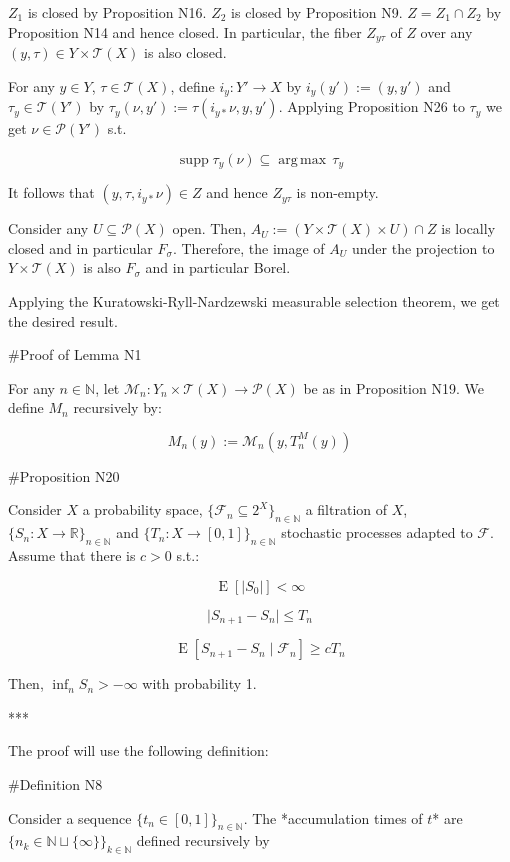 \documentclass[a4paper]{article}
\DeclareMathOperator{\Supp}{supp}
\DeclareMathOperator{\E}{E}
\newcommand{\Argmax}[1]{\underset{#1}{\operatorname{arg\,max}}\,}
\newcommand{\Nats}{\mathbb{N}}
\newcommand{\Reals}{\mathbb{R}}
\newcommand{\Sq}[2]{\{#1\}_{#2 \in \Nats}}
\newcommand{\Sqn}[1]{\Sq{#1}{n}}
\newcommand{\Abs}[1]{\lvert #1 \rvert}
\newcommand{\Prob}{\mathcal{P}}
\newcommand{\T}{\mathcal{T}}
\newcommand{\F}{\mathcal{F}}
\begin{document}
${Z_1}$ is closed by Proposition N16. ${Z_2}$ is closed by Proposition N9. ${Z = Z_1 \cap Z_2}$ by Proposition N14 and hence closed. In particular, the fiber ${Z_{y\tau}}$ of ${Z}$ over any ${(y,\tau) \in Y \times \T(X)}$ is also closed. 

For any ${y \in Y}$, ${\tau \in \T(X)}$, define ${i_y: Y' \rightarrow X}$ by ${i_y(y'):=(y,y')}$ and ${\tau_y \in \T(Y')}$ by ${\tau_y(\nu,y'):=\tau(i_{y*}\nu,y,y')}$. Applying Proposition N26 to ${\tau_y}$ we get ${\nu \in \Prob(Y')}$ s.t.

$$\Supp \tau_y(\nu) \subseteq \Argmax{} \tau_y$$

It follows that ${(y,\tau,i_{y*}\nu) \in Z}$ and hence ${Z_{y\tau}}$ is non-empty.

Consider any ${U \subseteq \Prob(X)}$ open. Then, ${A_U:=(Y \times \T(X) \times U) \cap Z}$ is locally closed and in particular ${F_\sigma}$. Therefore, the image of ${A_U}$ under the projection to ${Y \times \T(X)}$ is also ${F_\sigma}$ and in particular Borel. 

Applying the Kuratowski-Ryll-Nardzewski measurable selection theorem, we get the desired result.

\#Proof of Lemma N1

For any ${n \in \Nats}$, let ${\mathcal{M}_n: Y_n \times \T(X) \rightarrow \Prob(X)}$ be as in Proposition N19. We define ${M_n}$ recursively by:

$$M_n(y):=\mathcal{M}_n(y,T_n^M(y))$$

\#Proposition N20

Consider ${X}$ a probability space, ${\{\F_n \subseteq 2^X\}_{n \in \Nats}}$ a filtration of ${X}$, ${\{S_n:X \rightarrow \Reals\}_{n \in \Nats}}$ and ${\{T_n:X \rightarrow [0,1]\}_{n \in \Nats}}$ stochastic processes adapted to ${\F}$. Assume that there is ${c > 0}$ s.t.:

$$\E[\Abs{S_0}] < \infty$$

$$\Abs{S_{n+1}-S_n} \leq T_n$$

$$\E[S_{n+1} - S_n \mid \F_n] \geq c T_n$$

Then, ${\inf_{n} S_n > -\infty}$ with probability 1.

***

The proof will use the following definition:

\#Definition N8

Consider a sequence ${\Sqn{t_n \in [0,1]}}$. The *accumulation times of ${t}$* are ${\Sq{n_k \in \Nats \sqcup \{\infty\}}{k}}$ defined recursively by
\end{document}
